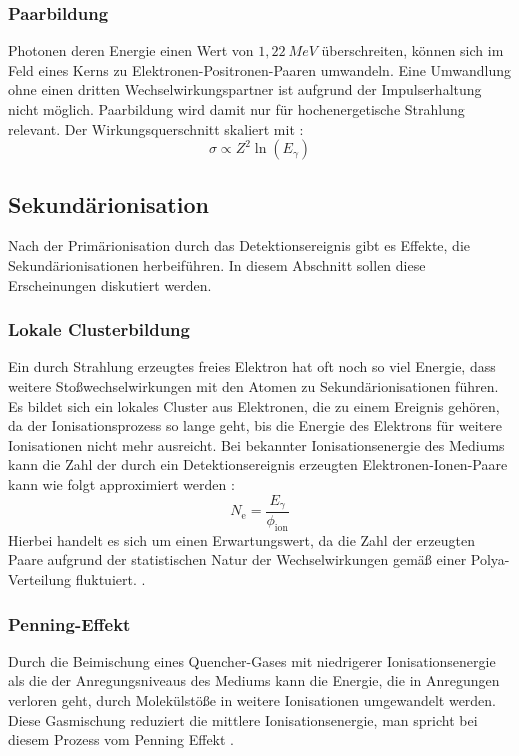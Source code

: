 		
		
		\subsubsection{Paarbildung}
		Photonen deren Energie einen Wert von $1,22\ \si{MeV}$ überschreiten, können sich im Feld eines Kerns zu Elektronen-Positronen-Paaren umwandeln. Eine Umwandlung ohne einen dritten Wechselwirkungspartner ist aufgrund der Impulserhaltung nicht möglich. Paarbildung wird damit nur für hochenergetische Strahlung relevant. Der Wirkungsquerschnitt skaliert mit \cite{DemtroderKerne}:
		\begin{equation*}
			\sigma \propto Z^{2}\ln(E_{\gamma})
		\end{equation*} 
		
		
	\newpage
	
	\subsection{Sekundärionisation}	\label{chap:Sekundär}
		Nach der Primärionisation durch das Detektionsereignis gibt es Effekte, die Sekundärionisationen herbeiführen. In diesem Abschnitt sollen diese Erscheinungen diskutiert werden. 
		
		\subsubsection{Lokale Clusterbildung}
			Ein durch Strahlung erzeugtes freies Elektron hat oft noch so viel Energie, dass weitere Stoßwechselwirkungen mit den Atomen zu Sekundärionisationen führen. Es bildet sich ein lokales Cluster aus Elektronen, die zu einem Ereignis gehören, da der Ionisationsprozess so lange geht, bis die Energie des Elektrons für weitere Ionisationen nicht mehr ausreicht. Bei bekannter Ionisationsenergie des Mediums kann die Zahl der durch ein Detektionsereignis erzeugten Elektronen-Ionen-Paare kann wie folgt approximiert werden \cite{Sauli_Multiwire}:
			\begin{equation} \label{eq:Primärionisation}
				N_{\text{e}}=\frac{E_{\gamma}}{\phi_{\text{ion}}}
			\end{equation}	
			Hierbei handelt es sich um einen Erwartungswert, da die Zahl der erzeugten Paare aufgrund der statistischen Natur der Wechselwirkungen gemäß einer Polya-Verteilung fluktuiert. \cite{ottnad}.
		
		\subsubsection{Penning-Effekt}
			Durch die Beimischung eines Quencher-Gases mit niedrigerer Ionisationsenergie als die der Anregungsniveaus des Mediums kann die Energie, die in Anregungen verloren geht, durch Molekülstöße in weitere Ionisationen umgewandelt werden. Diese Gasmischung reduziert die mittlere Ionisationsenergie, man spricht bei diesem Prozess vom Penning Effekt \cite{ottnad}.
			
